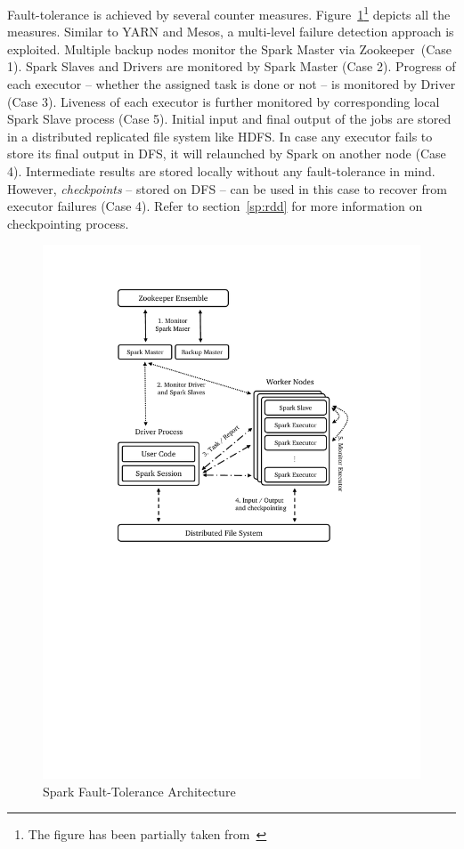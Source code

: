 \begin{description}[leftmargin=0pt]
     Fault-tolerance is achieved by several counter measures. Figure~\ref{fig:spark-full}\footnote{The figure has been partially taken from~\cite{spark-guide}} depicts all the measures. Similar to YARN and Mesos, a multi-level failure detection approach is exploited. Multiple backup nodes monitor the Spark Master via Zookeeper~(Case 1). Spark Slaves and Drivers are monitored by Spark Master (Case 2). Progress of each executor -- whether the assigned task is done or not -- is monitored by Driver (Case 3). Liveness of each executor is further monitored by corresponding local Spark Slave process (Case 5). Initial input and final output of the jobs are stored in a distributed replicated file system like HDFS. In case any executor fails to store its final output in DFS, it will relaunched by Spark on another node (Case 4). Intermediate results are stored locally without any fault-tolerance in mind. However, \emph{checkpoints} -- stored on DFS -- can be used in this case to recover from executor failures (Case 4). Refer to section~\ref{sp:rdd} for more information on checkpointing process. 
     \begin{figure}[ht]
         \centering
         \includegraphics[clip,trim=4cm 13cm 4cm 2.2cm]{spark-full.pdf}
         \caption[Spark Fault-Tolerance Architecture]{Spark Fault-Tolerance Architecture}
         \label{fig:spark-full}
     \end{figure}
\end{description}

